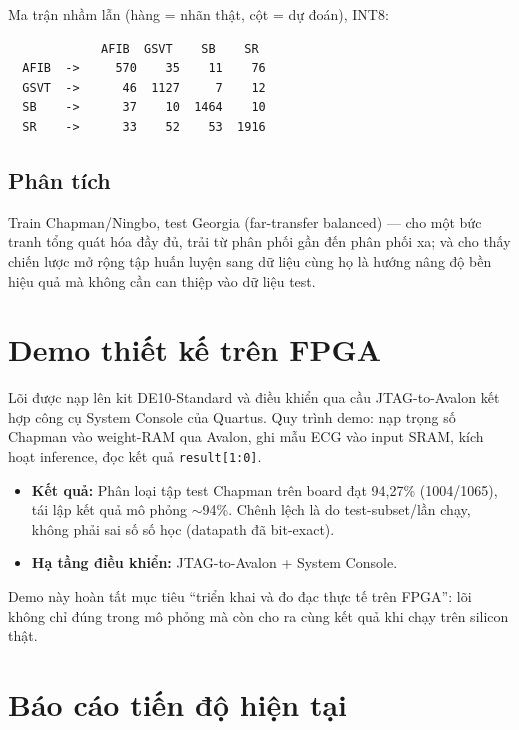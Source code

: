 \documentclass[12pt,a4paper]{article}
\begin{document}
Ma trận nhầm lẫn (hàng = nhãn thật, cột = dự đoán), INT8:

\begin{lstlisting}
             AFIB  GSVT    SB    SR
  AFIB  ->     570    35    11    76
  GSVT  ->      46  1127     7    12
  SB    ->      37    10  1464    10
  SR    ->      33    52    53  1916
\end{lstlisting}

\subsection{Phân tích}

Train Chapman/Ningbo, test Georgia (far-transfer balanced) --- cho một bức tranh tổng quát
hóa đầy đủ, trải từ phân phối gần đến phân phối xa; và cho thấy chiến lược mở rộng tập huấn
luyện sang dữ liệu cùng họ là hướng nâng độ bền hiệu quả mà không cần can thiệp vào dữ liệu
test.

\section{Demo thiết kế trên FPGA}

Lõi được nạp lên kit DE10-Standard và điều khiển qua cầu JTAG-to-Avalon kết hợp công cụ
System Console của Quartus. Quy trình demo: nạp trọng số Chapman vào weight-RAM qua Avalon,
ghi mẫu ECG vào input SRAM, kích hoạt inference, đọc kết quả \texttt{result[1:0]}.
\begin{itemize}
  \item \textbf{Kết quả:} Phân loại tập test Chapman trên board đạt 94,27\% (1004/1065), tái
        lập kết quả mô phỏng $\sim$94\%. Chênh lệch là do test-subset/lần chạy, không phải sai
        số số học (datapath đã bit-exact).
  \item \textbf{Hạ tầng điều khiển:} JTAG-to-Avalon + System Console.
\end{itemize}
Demo này hoàn tất mục tiêu ``triển khai và đo đạc thực tế trên FPGA'': lõi không chỉ đúng
trong mô phỏng mà còn cho ra cùng kết quả khi chạy trên silicon thật.

\section{Báo cáo tiến độ hiện tại}
\end{document}
